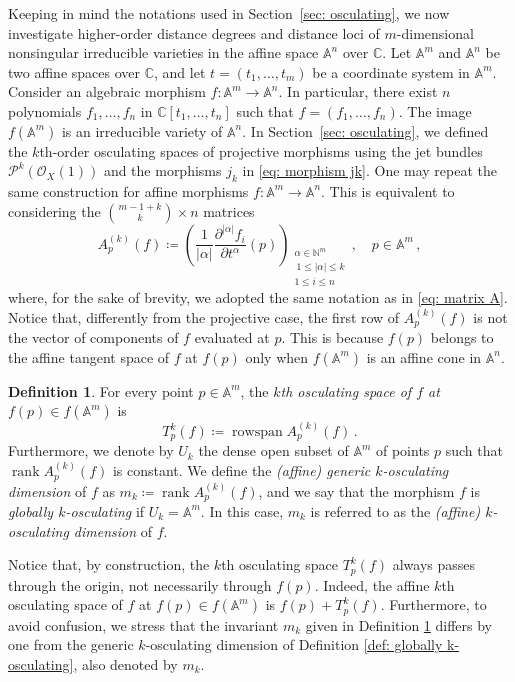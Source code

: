 \documentclass[11pt,reqno]{amsart}
\numberwithin{equation}{section}
\theoremstyle{plain}
\numberwithin{theorem}{section}
\theoremstyle{definition}
\newtheorem{definition}[theorem]{Definition}
\newcommand{\A}{\mathbb{A}}
\newcommand{\N}{\mathbb{N}}
\newcommand{\C}{\mathbb{C}}
\newcommand{\OO}{\mathcal{O}}
\newcommand{\PP}{\mathcal{P}}
\newcommand{\rank}{\operatorname{rank}}
\begin{document}
Keeping in mind the notations used in Section~\ref{sec: osculating}, we now investigate higher-order distance degrees and distance loci of $m$-dimensional nonsingular irreducible varieties in the affine space $\A^n$ over $\C$.
Let $\A^m$ and $\A^n$ be two affine spaces over $\C$, and let $t=(t_1,\dots,t_m)$ be a coordinate system in $\A^m$. Consider an algebraic morphism $f\colon\A^m\to\A^n$. In particular, there exist $n$ polynomials $f_1,\dots,f_n$ in $\C[t_1,\dots,t_n]$ such that $f=(f_1,\dots,f_n)$. The image $f(\A^m)$ is an irreducible variety of $\A^n$.
In Section~\ref{sec: osculating}, we defined the $k$th-order osculating spaces of projective morphisms using the jet bundles $\PP^k(\OO_X(1))$ and the morphisms $j_k$ in \eqref{eq: morphism jk}. One may repeat the same construction for affine morphisms $f\colon\A^m\to\A^n$. This is equivalent to considering the $\binom{m-1+k}{k}\times n$ matrices
\begin{equation}\label{eq: affine matrices Apk}
A_p^{(k)}(f) \coloneqq \left(\frac{1}{|\alpha|}\frac{\partial^{|\alpha|}f_i}{\partial t^\alpha}(p)\right)_{\substack{\alpha\in\N^m\\\ 1\le|\alpha|\le k\\1\le i\le n}}\,,\quad p\in\A^m\,,
\end{equation}
where, for the sake of brevity, we adopted the same notation as in \eqref{eq: matrix A}.
Notice that, differently from the projective case, the first row of $A_p^{(k)}(f)$ is not the vector of components of $f$ evaluated at $p$. This is because $f(p)$ belongs to the affine tangent space of $f$ at $f(p)$ only when $f(\A^m)$ is an affine cone in $\A^n$.
\begin{definition}\label{def: affine osculating space}
For every point $p\in\A^m$, the {\em $k$th osculating space of $f$ at $f(p)\in f(\A^m)$} is
\[
T_p^k(f) \coloneqq \operatorname{rowspan}A_p^{(k)}(f)\,.
\]
Furthermore, we denote by $U_k$ the dense open subset of $\A^m$ of points $p$ such that $\rank A_p^{(k)}(f)$ is constant. We define the {\em (affine) generic $k$-osculating dimension} of $f$ as $m_k\coloneqq\rank A_p^{(k)}(f)$, and we say that the morphism $f$ is {\em globally $k$-osculating} if $U_k=\A^m$. In this case, $m_k$ is referred to as the {\em (affine) $k$-osculating dimension} of $f$.
\end{definition}
Notice that, by construction, the $k$th osculating space $T_p^k(f)$ always passes through the origin, not necessarily through $f(p)$. Indeed, the affine $k$th osculating space of $f$ at $f(p)\in f(\A^m)$ is $f(p)+T_p^k(f)$. Furthermore, to avoid confusion, we stress that the invariant $m_k$ given in Definition \ref{def: affine osculating space} differs by one from the generic $k$-osculating dimension of Definition \ref{def: globally k-osculating}, also denoted by $m_k$.
\end{document}
